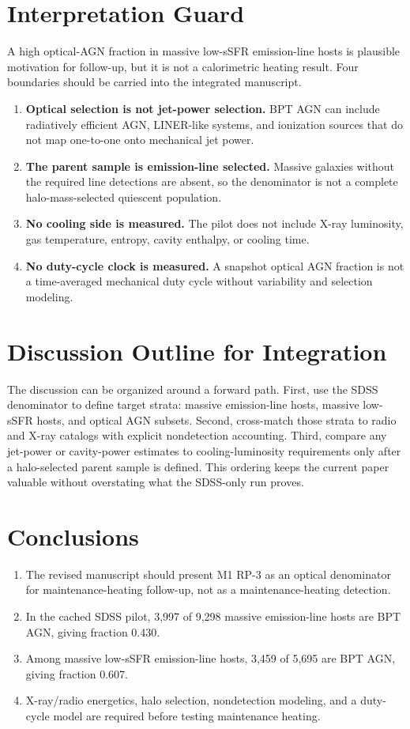 \documentclass[twocolumn]{aastex631}
\begin{document}
\section{Interpretation Guard}\label{sec:guard}
A high optical-AGN fraction in massive low-sSFR emission-line hosts is plausible motivation for follow-up, but it is not a calorimetric heating result.  Four boundaries should be carried into the integrated manuscript.
\begin{enumerate}
\item \textbf{Optical selection is not jet-power selection.}  BPT AGN can include radiatively efficient AGN, LINER-like systems, and ionization sources that do not map one-to-one onto mechanical jet power.
\item \textbf{The parent sample is emission-line selected.}  Massive galaxies without the required line detections are absent, so the denominator is not a complete halo-mass-selected quiescent population.
\item \textbf{No cooling side is measured.}  The pilot does not include X-ray luminosity, gas temperature, entropy, cavity enthalpy, or cooling time.
\item \textbf{No duty-cycle clock is measured.}  A snapshot optical AGN fraction is not a time-averaged mechanical duty cycle without variability and selection modeling.
\end{enumerate}

\section{Discussion Outline for Integration}\label{sec:discussion}
The discussion can be organized around a forward path.  First, use the SDSS denominator to define target strata: massive emission-line hosts, massive low-sSFR hosts, and optical AGN subsets.  Second, cross-match those strata to radio and X-ray catalogs with explicit nondetection accounting.  Third, compare any jet-power or cavity-power estimates to cooling-luminosity requirements only after a halo-selected parent sample is defined.  This ordering keeps the current paper valuable without overstating what the SDSS-only run proves.

\section{Conclusions}\label{sec:conclusions}
\begin{enumerate}
\item The revised manuscript should present M1 RP-3 as an optical denominator for maintenance-heating follow-up, not as a maintenance-heating detection.
\item In the cached SDSS pilot, 3,997 of 9,298 massive emission-line hosts are BPT AGN, giving fraction 0.430.
\item Among massive low-sSFR emission-line hosts, 3,459 of 5,695 are BPT AGN, giving fraction 0.607.
\item X-ray/radio energetics, halo selection, nondetection modeling, and a duty-cycle model are required before testing maintenance heating.
\end{enumerate}
\end{document}
